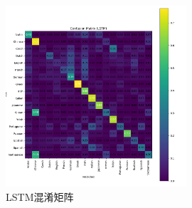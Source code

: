\documentclass[a4paper]{article}
\begin{document}
\begin{figure}[H]
    \centering
    \includegraphics[width=0.6\textwidth]{confusion_matrix_lstm.png}
    \caption{LSTM混淆矩阵}
    \label{fig:lstm_confusion}
\end{figure}
\end{document}
